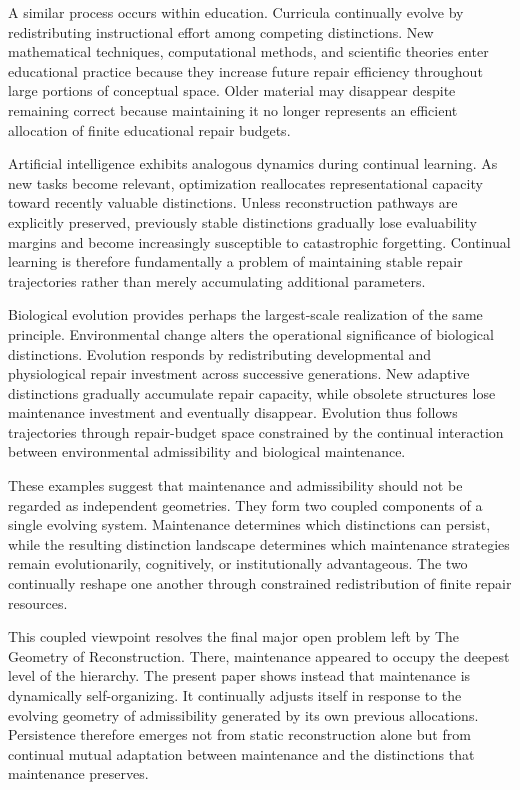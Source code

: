 \documentclass[12pt,oneside]{article}
\theoremstyle{plain}
\theoremstyle{definition}
\theoremstyle{remark}
\begin{document}
A similar process occurs within education. Curricula continually evolve by redistributing instructional effort among competing distinctions. New mathematical techniques, computational methods, and scientific theories enter educational practice because they increase future repair efficiency throughout large portions of conceptual space. Older material may disappear despite remaining correct because maintaining it no longer represents an efficient allocation of finite educational repair budgets.

Artificial intelligence exhibits analogous dynamics during continual learning. As new tasks become relevant, optimization reallocates representational capacity toward recently valuable distinctions. Unless reconstruction pathways are explicitly preserved, previously stable distinctions gradually lose evaluability margins and become increasingly susceptible to catastrophic forgetting. Continual learning is therefore fundamentally a problem of maintaining stable repair trajectories rather than merely accumulating additional parameters.

Biological evolution provides perhaps the largest-scale realization of the same principle. Environmental change alters the operational significance of biological distinctions. Evolution responds by redistributing developmental and physiological repair investment across successive generations. New adaptive distinctions gradually accumulate repair capacity, while obsolete structures lose maintenance investment and eventually disappear. Evolution thus follows trajectories through repair-budget space constrained by the continual interaction between environmental admissibility and biological maintenance.

These examples suggest that maintenance and admissibility should not be regarded as independent geometries. They form two coupled components of a single evolving system. Maintenance determines which distinctions can persist, while the resulting distinction landscape determines which maintenance strategies remain evolutionarily, cognitively, or institutionally advantageous. The two continually reshape one another through constrained redistribution of finite repair resources.

This coupled viewpoint resolves the final major open problem left by The Geometry of Reconstruction. There, maintenance appeared to occupy the deepest level of the hierarchy. The present paper shows instead that maintenance is dynamically self-organizing. It continually adjusts itself in response to the evolving geometry of admissibility generated by its own previous allocations. Persistence therefore emerges not from static reconstruction alone but from continual mutual adaptation between maintenance and the distinctions that maintenance preserves.
\end{document}
